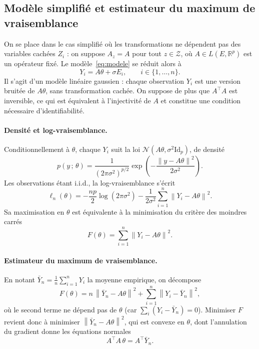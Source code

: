 \documentclass[12pt, a4paper]{article}
\theoremstyle{definition}
\newcommand{\R}{\mathbb{R}}
\newcommand{\Zcal}{\mathcal{Z}}
\newcommand{\Ncal}{\mathcal{N}}
\newcommand{\norm}[1]{\left\|#1\right\|}
\newcommand{\Id}{\mathrm{Id}}
\begin{document}
\subsection{Modèle simplifié et estimateur du maximum de vraisemblance}
\label{subsec:modele_simplifie}

On se place dans le cas simplifié où les transformations ne dépendent pas des
variables cachées $Z_i$ : on suppose $A_z = A$ pour tout $z \in \Zcal$,
où $A \in L(E, \R^p)$ est un opérateur fixé. Le modèle~\eqref{eq:modele}
se réduit alors à
\begin{equation}
    Y_i = A\theta + \sigma E_i, \qquad i \in \{1, \ldots, n\}.
    \label{eq:modele_simple}
\end{equation}
Il s'agit d'un modèle linéaire gaussien : chaque observation $Y_i$ est une
version bruitée de $A\theta$, sans transformation cachée. On suppose de plus
que $A^\top A$ est inversible, ce qui est équivalent à l'injectivité de $A$
et constitue une condition nécessaire d'identifiabilité.

\paragraph{Densité et log-vraisemblance.}
Conditionnellement à $\theta$, chaque $Y_i$ suit la loi $\Ncal(A\theta, \sigma^2\Id_p)$,
de densité
\[
    p(y\,;\,\theta)
    = \frac{1}{(2\pi\sigma^2)^{p/2}}
      \exp\!\left(-\frac{\norm{y - A\theta}^2}{2\sigma^2}\right).
\]
Les observations étant i.i.d., la log-vraisemblance s'écrit
\[
    \ell_n(\theta)
    = -\frac{np}{2}\log(2\pi\sigma^2)
      - \frac{1}{2\sigma^2}\sum_{i=1}^{n}\norm{Y_i - A\theta}^2.
\]
Sa maximisation en $\theta$ est équivalente à la minimisation du critère des
moindres carrés
\begin{equation}
    F(\theta) = \sum_{i=1}^{n}\norm{Y_i - A\theta}^2.
    \label{eq:moindres_carres_simple}
\end{equation}

\paragraph{Estimateur du maximum de vraisemblance.}
En notant $\bar{Y}_n = \frac{1}{n}\sum_{i=1}^{n} Y_i$ la moyenne empirique, on
décompose
\[
    F(\theta)
    = n\,\norm{\bar{Y}_n - A\theta}^2
      + \sum_{i=1}^{n}\norm{Y_i - \bar{Y}_n}^2,
\]
où le second terme ne dépend pas de $\theta$ (car $\sum_i(Y_i - \bar{Y}_n) = 0$).
Minimiser $F$ revient donc à minimiser $\norm{\bar{Y}_n - A\theta}^2$, qui est convexe en $\theta$, dont
l'annulation du gradient donne les équations normales
\[
    A^\top A\,\theta = A^\top \bar{Y}_n.
\]
\end{document}

